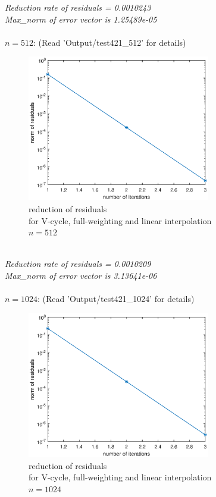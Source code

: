 \documentclass[a4paper,twocolumn]{article}
\theoremstyle{definition}
\begin{document}
\noindent \emph{Reduction rate of residuals = 0.0010243}\\
\emph{Max\_norm of error vector is 1.25489e-05}\\\\
\newpage
\noindent $n=512$: (Read 'Output/test421\_512' for details)
\begin{figure}[!htp]   
	\centering
	\includegraphics[width=8cm]{Pictures/F421_3.eps}
	\caption{reduction of residuals \\for V-cycle, full-weighting and linear interpolation\\ $n = 512$}
\end{figure}\\
\noindent \emph{Reduction rate of residuals = 0.0010209}\\
\emph{Max\_norm of error vector is 3.13641e-06}\\\\
$n=1024$: (Read 'Output/test421\_1024' for details)
\begin{figure}[!htp]   
	\centering
	\includegraphics[width=8cm]{Pictures/F421_4.eps}
	\caption{reduction of residuals \\for V-cycle, full-weighting and linear interpolation\\ $n = 1024$}
\end{figure}\\
\end{document}
